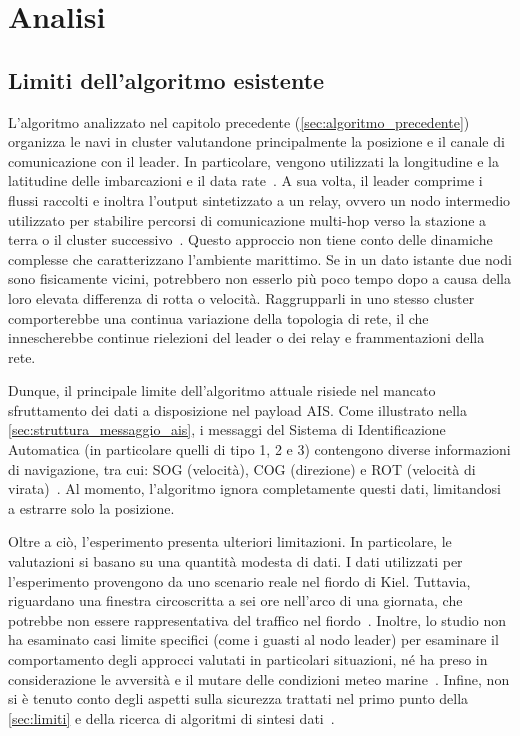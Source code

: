 \chapter{Analisi}
\label{chap:analisi}

\section{Limiti dell'algoritmo esistente}
\label{sec:limiti_algoritmo_esistente}

L'algoritmo analizzato nel capitolo precedente (\cref{sec:algoritmo_precedente}) organizza le navi in cluster valutandone principalmente la posizione e il canale di comunicazione con il leader. In particolare, vengono utilizzati la longitudine e la latitudine delle imbarcazioni e il data rate~\cite{11217861}. A sua volta, il leader comprime i flussi raccolti e inoltra l'output sintetizzato a un relay, ovvero un nodo intermedio utilizzato per stabilire percorsi di comunicazione multi-hop verso la stazione a terra o il cluster successivo~\cite{11217861}. Questo approccio non tiene conto delle dinamiche complesse che caratterizzano l'ambiente marittimo. Se in un dato istante due nodi sono fisicamente vicini, potrebbero non esserlo più poco tempo dopo a causa della loro elevata differenza di rotta o velocità. Raggrupparli in uno stesso cluster comporterebbe una continua variazione della topologia di rete, il che innescherebbe continue rielezioni del leader o dei relay e frammentazioni della rete.

Dunque, il principale limite dell'algoritmo attuale risiede nel mancato sfruttamento dei dati a disposizione nel payload \ac{AIS}.
Come illustrato nella \cref{sec:struttura_messaggio_ais}, i messaggi del Sistema di Identificazione Automatica (in particolare quelli di tipo 1, 2 e 3) contengono diverse informazioni di navigazione, tra cui: \ac{SOG} (velocità), \ac{COG} (direzione) e \ac{ROT} (velocità di virata)~\cite{itu_m1371_6}. Al momento, l'algoritmo ignora completamente questi dati, limitandosi a estrarre solo la posizione.

Oltre a ciò, l'esperimento presenta ulteriori limitazioni. In particolare, le valutazioni si basano su una quantità modesta di dati. I dati utilizzati per l'esperimento provengono da uno scenario reale nel fiordo di Kiel. Tuttavia, riguardano una finestra circoscritta a sei ore nell'arco di una giornata, che potrebbe non essere rappresentativa del traffico nel fiordo~\cite{11217861}. Inoltre, lo studio non ha esaminato casi limite specifici (come i guasti al nodo leader) per esaminare il comportamento degli approcci valutati in particolari situazioni, né ha preso in considerazione le avversità e il mutare delle condizioni meteo marine~\cite{11217861}. Infine, non si è tenuto conto degli aspetti sulla sicurezza trattati nel primo punto della \cref{sec:limiti} e della ricerca di algoritmi di sintesi dati~\cite{11217861}.


